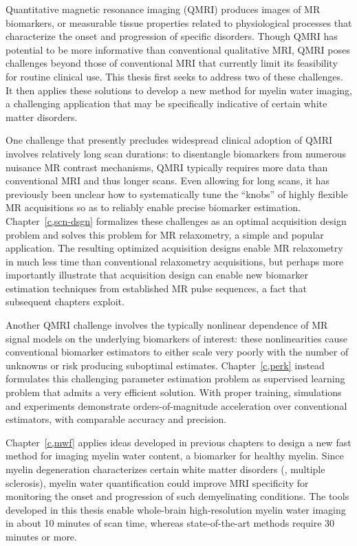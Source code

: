 \setlength{\parindent}{0ex}
Quantitative magnetic resonance imaging (QMRI)
produces images of MR biomarkers,
or measurable tissue properties
related to physiological processes
that characterize the onset and progression
of specific disorders.
Though QMRI has potential 
to be more informative 
than conventional qualitative MRI,
QMRI poses challenges 
beyond those of conventional MRI
that currently limit its feasibility 
for routine clinical use.
This thesis first seeks to address 
two of these challenges.
It then applies these solutions
to develop a new method
for myelin water imaging,
a challenging application 
that may be specifically indicative
of certain white matter disorders. 

\setlength{\parindent}{4ex}
One challenge 
that presently precludes widespread clinical adoption of QMRI
involves relatively long scan durations:
to disentangle biomarkers
from numerous nuisance MR contrast mechanisms,
QMRI typically requires more data than conventional MRI
and thus longer scans. 
Even allowing for long scans,
it has previously been unclear 
how to systematically tune the ``knobs'' 
of highly flexible MR acquisitions
so as to reliably enable precise biomarker estimation.
Chapter~\ref{c,scn-dsgn} formalizes these challenges
as an optimal acquisition design problem
and solves this problem for MR relaxometry,
a simple and popular application.
The resulting optimized acquisition designs
enable MR relaxometry
in much less time 
than conventional relaxometry acquisitions, 
but perhaps more importantly illustrate
that acquisition design can enable 
new biomarker estimation techniques
from established MR pulse sequences,
a fact that subsequent chapters exploit.

Another QMRI challenge
involves the typically nonlinear dependence 
of MR signal models
on the underlying biomarkers of interest:
these nonlinearities 
cause conventional biomarker estimators
to either scale very poorly 
with the number of unknowns
or risk producing suboptimal estimates.
Chapter~\ref{c,perk} instead formulates
this challenging parameter estimation problem
as supervised learning problem
that admits a very efficient solution.
With proper training,
simulations and experiments 
demonstrate orders-of-magnitude acceleration
over conventional estimators,
with comparable accuracy and precision.

Chapter~\ref{c,mwf} applies ideas 
developed in previous chapters
to design a new fast method
for imaging myelin water content,
a biomarker for healthy myelin.
Since myelin degeneration characterizes
certain white matter disorders
(\ie, multiple sclerosis),
myelin water quantification
could improve MRI specificity
for monitoring the onset and progression
of such demyelinating conditions.
The tools developed in this thesis enable 
whole-brain high-resolution myelin water imaging 
in about 10 minutes of scan time,
whereas state-of-the-art methods
require 30 minutes or more.
